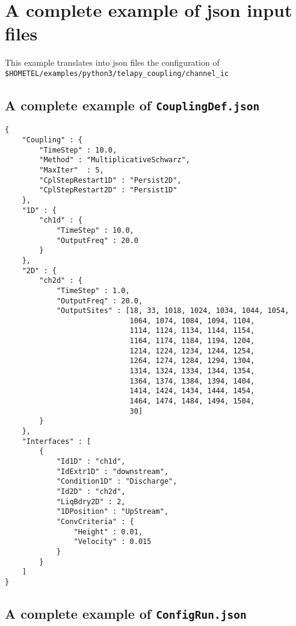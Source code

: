 \chapter{A complete example of json input files}

This example translates into json files the configuration of\\
\texttt{\$HOMETEL/examples/python3/telapy\_coupling/channel\_ic}

\section{A complete example of
  \texttt{CouplingDef.json}}\label{app:CouplingDef}

\begin{verbatim}
{
    "Coupling" : {
        "TimeStep" : 10.0,
        "Method" : "MultiplicativeSchwarz",
        "MaxIter"  : 5,
        "CplStepRestart1D" : "Persist2D",
        "CplStepRestart2D" : "Persist1D"
    },
    "1D" : {
        "ch1d" : {
            "TimeStep" : 10.0,
            "OutputFreq" : 20.0
        }
    },
    "2D" : {
        "ch2d" : {
            "TimeStep" : 1.0,
            "OutputFreq" : 20.0,
            "OutputSites" : [18, 33, 1018, 1024, 1034, 1044, 1054,
                             1064, 1074, 1084, 1094, 1104,
                             1114, 1124, 1134, 1144, 1154,
                             1164, 1174, 1184, 1194, 1204,
                             1214, 1224, 1234, 1244, 1254,
                             1264, 1274, 1284, 1294, 1304,
                             1314, 1324, 1334, 1344, 1354,
                             1364, 1374, 1384, 1394, 1404,
                             1414, 1424, 1434, 1444, 1454,
                             1464, 1474, 1484, 1494, 1504,
                             30]
        }
    },
    "Interfaces" : [
        {
            "Id1D" : "ch1d",
            "IdExtr1D" : "downstream",
            "Condition1D" : "Discharge",
            "Id2D" : "ch2d",
            "LiqBdry2D" : 2,
            "1DPosition" : "UpStream",
            "ConvCriteria" : {
                "Height" : 0.01,
                "Velocity" : 0.015
            }
        }
    ]
}
\end{verbatim}

\section{A complete example of
  \texttt{ConfigRun.json}}\label{app:ConfigRun}

